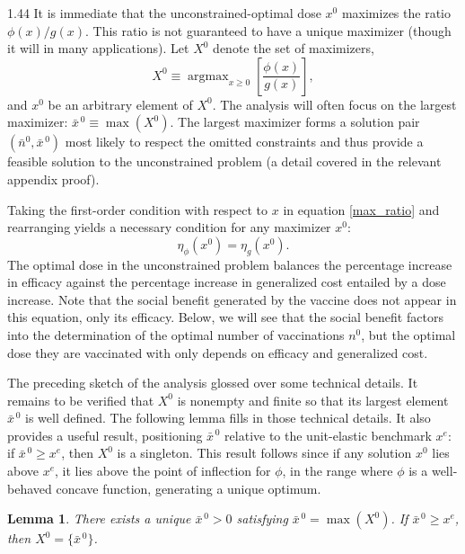 \documentclass[12pt]{article}
\DeclareMathOperator*{\argmax}{argmax}
\newcommand{\efficacy}{\phi}
\newcommand{\general}{g}
\newcommand{\xunit}{x^{e}}
\newcommand{\xno}{x^{0}}
\newcommand{\Xno}{X^{0}}
\newcommand{\xnobar}{\bar{x}^{\,0}}
\newcommand{\nno}{n^{0}}
\newcommand{\nnobar}{\bar{n}^{0}}
\newcommand{\elasticity}[1]{\eta_{#1}}
\newtheorem{lemma}{Lemma}
\begin{document}
\begin{spacing}{1.44}
It is immediate that the unconstrained-optimal dose $\xno$ maximizes
the ratio $\efficacy(x) / \general(x)$. This ratio is not guaranteed
to have a unique maximizer (though it will in many applications). Let
$\Xno$ denote the set of maximizers,
\begin{equation}
\label{max_ratio}
\Xno \equiv \argmax_{x \geq 0} \left[
  \frac{\efficacy(x)}{\general(x)} \right],
\end{equation}
and $\xno$ be an arbitrary element of $\Xno$. The analysis will often
focus on the largest maximizer: $\xnobar \equiv \max(\Xno)$. The
largest maximizer forms a solution pair $(\nnobar, \xnobar)$ most
likely to respect the omitted constraints and thus provide a feasible
solution to the unconstrained problem (a detail covered in the
relevant appendix proof).

Taking the first-order condition with respect to $x$ in equation
\eqref{max_ratio} and rearranging yields a necessary condition for any
maximizer $\xno$:
\begin{equation}
\label{equal_elasticities}
\elasticity{\efficacy}(\xno) = \elasticity{\general}(\xno). 
\end{equation}
The optimal dose in the unconstrained problem balances the percentage
increase in efficacy against the percentage increase in generalized
cost entailed by a dose increase. Note that the social benefit
generated by the vaccine does not appear in this equation, only its
efficacy. Below, we will see that the social benefit factors into the
determination of the optimal number of vaccinations $\nno$, but the
optimal dose they are vaccinated with only depends on efficacy and
generalized cost.

The preceding sketch of the analysis glossed over some technical
details. It remains to be verified that $\Xno$ is nonempty and finite
so that its largest element $\xnobar$ is well defined. The following
lemma fills in those technical details. It also provides a useful
result, positioning $\xnobar$ relative to the unit-elastic benchmark
$\xunit$: if $\xnobar \geq \xunit$, then $\Xno$ is a singleton. This
result follows since if any solution $\xno$ lies above $\xunit$, it
lies above the point of inflection for $\phi$, in the range where
$\phi$ is a well-behaved concave function, generating a unique
optimum.
\begin{lemma}
\label{l:xno}
\singlespace
There exists a unique $\xnobar > 0$ satisfying $\xnobar =
\max(\Xno)$. If $\xnobar \geq \xunit$, then $\Xno = \{ \xnobar \}$.
\end{lemma}


\end{spacing}
\end{document}
